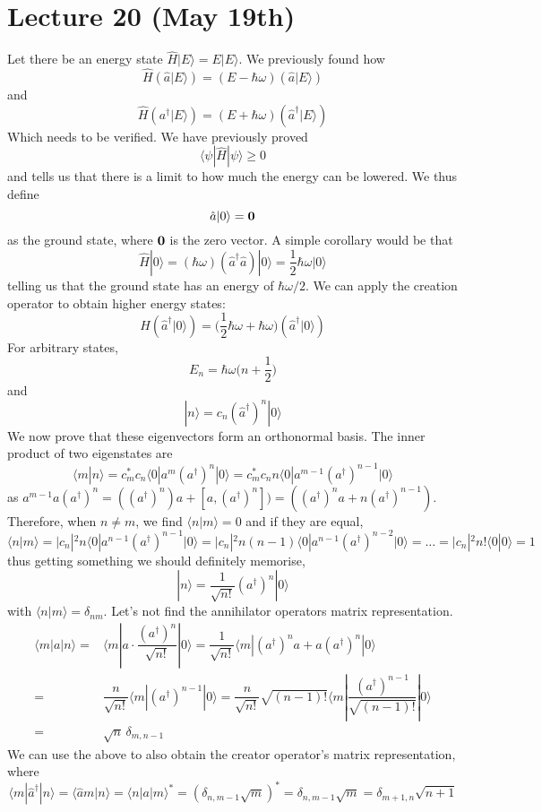\section{Lecture 20 (May 19th)}
\begin{thm}
Let there be an energy state $\hat{H}|E\rangle =E|E\rangle $. We previously found how
\[\hat{H}(\hat{a}|E\rangle )=(E-\hbar \omega )(\hat{a}|E\rangle )\]
and
\[\hat{H}(a^{\dagger}|E\rangle )=(E+\hbar \omega )(\hat{a}^{\dagger}|E\rangle )\]
Which needs to be verified. We have previously proved
\[\langle \psi |\hat{H}|\psi \rangle \geq 0\]
and tells us that there is a limit to how much the energy can be lowered. We thus define
\[\hat{a}|0\rangle ={\bf 0}\]
as the ground state, where ${\bf 0}$ is the zero vector. A simple corollary would be that
\[\hat{H}|0\rangle =(\hbar \omega )(\hat{a}^{\dagger}\hat{a})|0\rangle =\dfrac{1}{2}\hbar \omega |0\rangle \]
telling us that the ground state has an energy of $\hbar \omega /2$. We can apply the creation operator to obtain higher energy states:
\[H(\hat{a}^{\dagger}|0\rangle )=\Big(\dfrac{1}{2}\hbar \omega +\hbar \omega \Big)(\hat{a}^{\dagger}|0\rangle )\]
For arbitrary states,
\[E_{n}=\hbar \omega \Big(n+\dfrac{1}{2}\Big)\]
and
\[|n\rangle =c_{n}(\hat{a}^{\dagger})^{n}|0\rangle \]
We now prove that these eigenvectors form an orthonormal basis. The inner product of two eigenstates are
\[\langle m|n\rangle =c_{m}^{*}c_{n}\langle 0|a^{m}(a^{\dagger})^{n}|0\rangle =c_{m}^*c_{n}n\langle 0|a^{m-1}(a^{\dagger})^{n-1}|0\rangle \]
as $a^{m-1}a(a^{\dagger})^{n}=((a^{\dagger})^{n})a+[a,(a^{\dagger})^{n}])=((a^{\dagger})^{n}a+n(a^{\dagger})^{n-1})$. Therefore, when $n\ne m$, we find $\langle n|m\rangle =0$ and if they are equal,
\[\langle n|m\rangle =|c_{n}|^2n\langle 0|a^{n-1}(a^{\dagger})^{n-1}|0\rangle =|c_{n}|^2n(n-1)\langle 0|a^{n-1}(a^{\dagger})^{n-2}|0\rangle =\ldots =|c_{n}|^2n!\langle 0|0\rangle =1\]
thus getting something we should definitely memorise,
\[|n\rangle =\dfrac{1}{\sqrt{n!}}(a^{\dagger})^{n}|0\rangle \]
with $\langle n|m\rangle =\delta_{nm}$. Let's not find the annihilator operators matrix representation.
\begin{align*}
\langle m|a|n\rangle =&\langle m|a\cdot \dfrac{(a^{\dagger})^{n}}{\sqrt{n!}}|0\rangle =\dfrac{1}{\sqrt{n!}}\langle m|(a^{\dagger})^{n}a+a(a^{\dagger})^{n}|0\rangle \\
=&\dfrac{n}{\sqrt{n!}}\langle m|(a^{\dagger})^{n-1}|0\rangle=\dfrac{n}{\sqrt{n!}}\sqrt{(n-1)!}\langle m|\dfrac{(a^{\dagger})^{n-1}}{\sqrt{(n-1)!}}|0\rangle\\ =&\sqrt{n}\,\delta _{m,n-1}
\end{align*}
We can use the above to also obtain the creator operator's matrix representation, where
\[\langle m|\hat{a}^{\dagger}|n\rangle =\langle \hat{a}m|n\rangle =\langle n|a|m\rangle ^{*}=(\delta _{n,m-1}\sqrt{m})^{*}=\delta _{n,m-1}\sqrt{m}=\delta _{m+1,n}\sqrt{n+1}\]
\end{thm}
